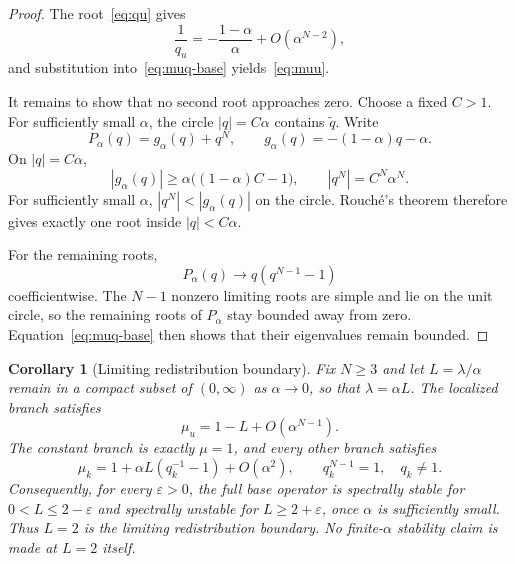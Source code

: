 \documentclass[preprint,12pt]{elsarticle}
\newtheorem{corollary}[theorem]{Corollary}
\begin{document}
\begin{proof}
The root~\eqref{eq:qu} gives
\[
    \frac1{q_u}
    =
    -\frac{1-\alpha}{\alpha}
    +O(\alpha^{N-2}),
\]
and substitution into~\eqref{eq:muq-base} yields~\eqref{eq:muu}.

It remains to show that no second root approaches zero.  Choose a fixed
$C>1$.  For sufficiently small $\alpha$, the circle $|q|=C\alpha$ contains
$\widetilde q$.  Write
\[
    P_\alpha(q)=g_\alpha(q)+q^N,\qquad
    g_\alpha(q)=-(1-\alpha)q-\alpha.
\]
On $|q|=C\alpha$,
\[
 |g_\alpha(q)|
 \ge
 \alpha\bigl((1-\alpha)C-1\bigr),
 \qquad
 |q^N|=C^N\alpha^N.
\]
For sufficiently small $\alpha$, $|q^N|<|g_\alpha(q)|$ on the circle.
Rouch\'e's theorem therefore gives exactly one root inside
$|q|<C\alpha$.

For the remaining roots,
\[
 P_\alpha(q)\longrightarrow q(q^{N-1}-1)
\]
coefficientwise.  The $N-1$ nonzero limiting roots are simple and lie on the
unit circle, so the remaining roots of $P_\alpha$ stay bounded away from zero.
Equation~\eqref{eq:muq-base} then shows that their eigenvalues remain bounded.
\end{proof}

\begin{corollary}[Limiting redistribution boundary]
\label{cor:threshold}
Fix $N\ge3$ and let $L=\lambda/\alpha$ remain in a compact subset of
$(0,\infty)$ as $\alpha\to0$, so that $\lambda=\alpha L$.  The localized
branch satisfies
\begin{equation}
    \mu_u=1-L+O(\alpha^{N-1}).
    \label{eq:muu-fixedL}
\end{equation}
The constant branch is exactly $\mu=1$, and every other branch satisfies
\begin{equation}
    \mu_k
    =1+\alpha L(q_k^{-1}-1)+O(\alpha^2),
    \qquad q_k^{N-1}=1,\quad q_k\ne1.
    \label{eq:regular-fixedL}
\end{equation}
Consequently, for every $\varepsilon>0$, the full base operator is spectrally stable for $0<L\le2-\varepsilon$ and spectrally unstable for
$L\ge2+\varepsilon$, once $\alpha$ is sufficiently small.  Thus $L=2$ is the
limiting redistribution boundary.  No finite-$\alpha$ stability claim is made at
$L=2$ itself.
\end{corollary}
\end{document}
